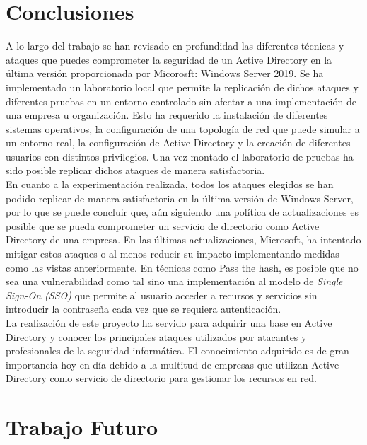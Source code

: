 \section{Conclusiones}

A lo largo del trabajo se han revisado en profundidad las diferentes técnicas y ataques que puedes comprometer la seguridad de un Active Directory en la última versión proporcionada por Micorosft: Windows Server 2019. Se ha implementado un laboratorio local que permite la replicación de dichos ataques y diferentes pruebas en un entorno controlado sin afectar a una implementación de una empresa u organización. Esto ha requerido la instalación de diferentes sistemas operativos, la configuración de una topología de red que puede simular a un entorno real, la configuración de Active Directory y la creación de diferentes usuarios con distintos privilegios. Una vez montado el laboratorio de pruebas ha sido posible replicar dichos ataques de manera satisfactoria. \\

En cuanto a la experimentación realizada, todos los ataques elegidos se han podido replicar de manera satisfactoria en la última versión de Windows Server, por lo que se puede concluir que, aún siguiendo una política de actualizaciones es posible que se pueda comprometer un servicio de directorio como Active Directory de una empresa. En las últimas actualizaciones, Microsoft, ha intentado mitigar estos ataques o al menos reducir su impacto implementando medidas como las vistas anteriormente. En técnicas como Pass the hash, es posible que no sea una vulnerabilidad como tal sino una implementación al modelo de {\it Single Sign-On (SSO)} que permite al usuario acceder a recursos y servicios sin introducir la contraseña cada vez que se requiera autenticación. \\


La realización de este proyecto ha servido para adquirir una base en Active Directory y conocer los principales ataques utilizados por atacantes y profesionales de la seguridad informática. El conocimiento adquirido es de gran importancia hoy en día debido a la multitud de empresas que utilizan Active Directory como servicio de directorio para gestionar los recursos en red.\\

\section{Trabajo Futuro}

